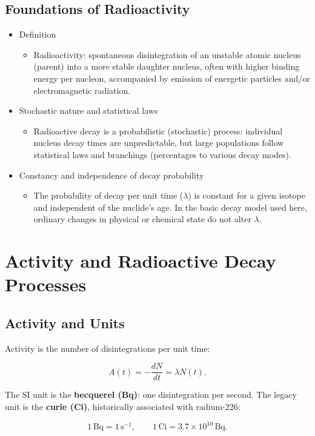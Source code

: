 \documentclass[11pt,a4paper]{article}
\let\originalsection\section
\renewcommand{\section}{\Needspace{7\baselineskip}\originalsection}
\let\originalsubsection\subsection
\renewcommand{\subsection}{\Needspace{8\baselineskip}\originalsubsection}
\begin{document}
\subsection{Foundations of Radioactivity}
\begin{itemize}
\item Definition
\begin{itemize}
\item Radioactivity: spontaneous disintegration of an unstable atomic nucleus (parent) into a more stable daughter nucleus, often with higher binding energy per nucleon, accompanied by emission of energetic particles and/or electromagnetic radiation.
\end{itemize}
\item Stochastic nature and statistical laws
\begin{itemize}
\item Radioactive decay is a probabilistic (stochastic) process: individual nucleus decay times are unpredictable, but large populations follow statistical laws and branchings (percentages to various decay modes).
\end{itemize}
\item Constancy and independence of decay probability
\begin{itemize}
\item The probability of decay per unit time (\ensuremath{\lambda}) is constant for a given isotope and independent of the nuclide's age. In the basic decay model used here, ordinary changes in physical or chemical state do not alter \ensuremath{\lambda}.
\end{itemize}
\end{itemize}

\clearpage
\section{Activity and Radioactive Decay Processes}
\subsection{Activity and Units}
Activity is the number of disintegrations per unit time:

\[A(t)=-\frac{dN}{dt}=\lambda N(t).\]

The SI unit is the \textbf{becquerel (Bq)}: one disintegration per second. The legacy unit is the \textbf{curie (Ci)}, historically associated with radium-226:

\[1\,\mathrm{Bq}=1\,\mathrm{s}^{-1},\qquad 1\,\mathrm{Ci}=3.7\times10^{10}\,\mathrm{Bq}.\]
\end{document}
